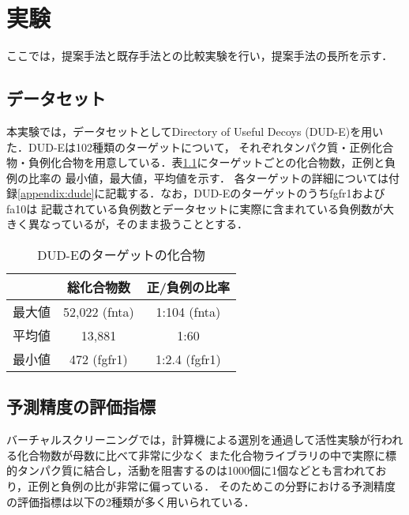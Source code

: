 \chapter{実験}
ここでは，提案手法と既存手法との比較実験を行い，提案手法の長所を示す．


\section{データセット}
本実験では，データセットとしてDirectory of Useful Decoys (DUD-E)\cite{Mysinger2012}を用いた．DUD-Eは102種類のターゲットについて，
それぞれタンパク質・正例化合物・負例化合物を用意している．表\ref{table:dude}にターゲットごとの化合物数，正例と負例の比率の
最小値，最大値，平均値を示す．
各ターゲットの詳細については付録\ref{appendix:dude}に記載する．なお，DUD-Eのターゲットのうちfgfr1およびfa10は
記載されている負例数とデータセットに実際に含まれている負例数が大きく異なっているが，そのまま扱うこととする．

\begin{table}[htb] \centering
	\caption{DUD-Eのターゲットの化合物}
	\label {table:dude}
	\begin{tabular}{c|cc}
	\hline
			&総化合物数		&正/負例の比率	\\ \hline
	最大値	&52,022 (fnta)		&1:104 (fnta)		\\
	平均値	&13,881			&1:60			\\
	最小値	&472 (fgfr1)		&1:2.4 (fgfr1)		\\ \hline
	\end{tabular}
\end{table}

	
\section{予測精度の評価指標}
バーチャルスクリーニングでは，計算機による選別を通過して活性実験が行われる化合物数が母数に比べて非常に少なく
また化合物ライブラリの中で実際に標的タンパク質に結合し，活動を阻害するのは1000個に1個などとも言われており，正例と負例の比が非常に偏っている．
そのためこの分野における予測精度の評価指標は以下の2種類が多く用いられている．

